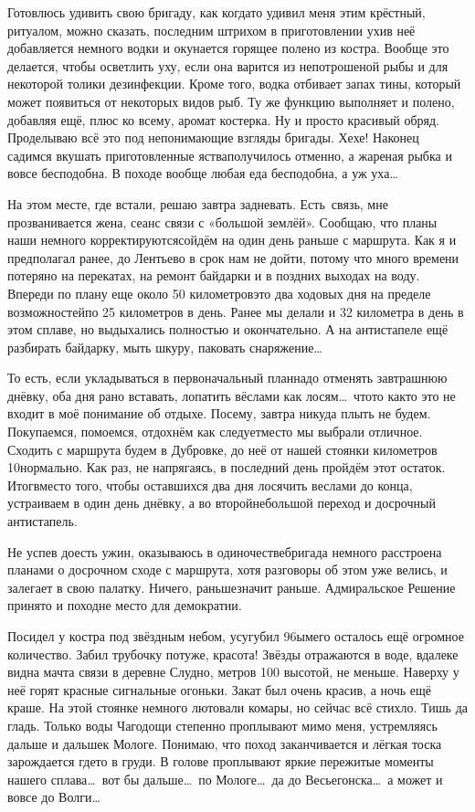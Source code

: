 Готовлюсь удивить свою бригаду, как когда\sdash то удивил меня этим крёстный, ритуалом, можно сказать, последним штрихом в приготовлении ухи\mdash в неё добавляется немного водки и окунается горящее полено из костра. Вообще это делается, чтобы осветлить уху, если она варится из непотрошеной рыбы и для некоторой толики дезинфекции. Кроме того, водка отбивает запах тины, который может появиться от некоторых видов рыб. Ту же функцию выполняет и полено, добавляя ещё, плюс ко всему, аромат костерка. Ну и просто красивый обряд. Проделываю всё это под непонимающие взгляды бригады. Хе\sdash хе! Наконец садимся вкушать приготовленные яства\mdash получилось отменно, а жареная рыбка и вовсе бесподобна. В походе вообще любая еда бесподобна, а уж уха\ldots~

На этом месте, где встали, решаю завтра задневать. Есть~связь, мне прозванивается жена, сеанс связи с «большой землёй». Сообщаю, что планы наши немного корректируются\mdash сойдём на один день раньше с маршрута. Как я и предполагал ранее, до Лентьево в срок нам не дойти, потому что много времени потеряно на перекатах, на ремонт байдарки и в поздних выходах на воду. Впереди по плану еще около 50 километров\mdash это два ходовых дня на пределе возможностей\mdash по 25 километров в день. Ранее мы делали и 32 километра в день в этом сплаве, но выдыхались полностью и окончательно. А на антистапеле ещё разбирать байдарку, мыть шкуру, паковать снаряжение\ldots~

То есть, если укладываться в первоначальный план\mdash надо отменять завтрашнюю днёвку, оба дня рано вставать, лопатить вёслами как лосям\ldots~что\sdash то как\sdash то это не входит в моё понимание об отдыхе. Посему, завтра никуда плыть не будем. Покупаемся, помоемся, отдохнём как следует\mdash место мы выбрали отличное. Сходить с маршрута будем в Дубровке, до неё от нашей стоянки километров 10\mdash нормально. Как раз, не напрягаясь, в последний день пройдём этот остаток. Итог\mdash вместо того, чтобы оставшихся два дня лосячить веслами до конца, устраиваем в один день днёвку, а во второй\mdash небольшой переход и досрочный антистапель. 

Не успев доесть ужин, оказываюсь в одиночестве\mdash бригада немного расстроена планами о досрочном сходе с маршрута, хотя разговоры об этом уже велись, и залегает в свою палатку. Ничего, раньше\mdash значит раньше. Адмиральское Решение принято и поход\mdash не место для демократии. 

Посидел у костра под звёздным небом, усугубил 96\sdash ым\mdash его осталось ещё огромное количество. Забил трубочку потуже, красота! Звёзды отражаются в воде, вдалеке видна мачта связи в деревне Слудно, метров 100 высотой, не меньше. Наверху у неё горят красные сигнальные огоньки. Закат был очень красив, а ночь ещё краше. На этой стоянке немного лютовали комары, но сейчас всё стихло. Тишь да гладь. Только воды Чагодощи степенно проплывают мимо меня, устремляясь дальше и дальше\mdash к Мологе. Понимаю, что поход заканчивается и лёгкая тоска зарождается где\sdash то в груди. В голове проплывают яркие пережитые моменты нашего сплава\ldots~вот бы дальше\ldots~по Мологе\ldots~да до Весьегонска\ldots~а может и вовсе до Волги\ldots~

\begin{center}
\end{center}